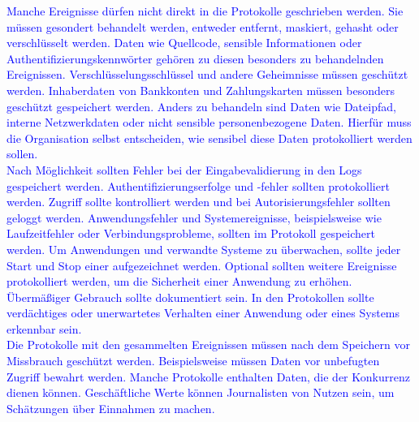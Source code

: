 \textcolor{blue}{
    Manche Ereignisse dürfen nicht direkt in die Protokolle geschrieben werden.
    Sie müssen gesondert behandelt werden, entweder entfernt, maskiert, gehasht oder verschlüsselt werden.
    Daten wie Quellcode, sensible Informationen oder Authentifizierungskennwörter gehören zu diesen besonders zu behandelnden Ereignissen.
    Verschlüsselungsschlüssel und andere Geheimnisse müssen geschützt werden.
    Inhaberdaten von Bankkonten und Zahlungskarten müssen besonders geschützt gespeichert werden.
    Anders zu behandeln sind Daten wie Dateipfad, interne Netzwerkdaten oder nicht sensible personenbezogene Daten.
    Hierfür muss die Organisation selbst entscheiden, wie sensibel diese Daten protokolliert werden sollen.
    \\
    Nach Möglichkeit sollten Fehler bei der Eingabevalidierung in den Logs gespeichert werden.
    Authentifizierungserfolge und -fehler sollten protokolliert werden.
    Zugriff sollte kontrolliert werden und bei Autorisierungsfehler sollten geloggt werden.
    Anwendungsfehler und Systemereignisse, beispielsweise wie Laufzeitfehler oder Verbindungsprobleme, sollten im Protokoll gespeichert werden.
    Um Anwendungen und verwandte Systeme zu überwachen, sollte jeder Start und Stop einer aufgezeichnet werden.
    Optional sollten weitere Ereignisse protokolliert werden, um die Sicherheit einer Anwendung zu erhöhen.
    Übermäßiger Gebrauch sollte dokumentiert sein.
    In den Protokollen sollte verdächtiges oder unerwartetes Verhalten einer Anwendung oder eines Systems erkennbar sein.
    \\
    Die Protokolle mit den gesammelten Ereignissen müssen nach dem Speichern vor Missbrauch geschützt werden.
    Beispielsweise müssen Daten vor unbefugten Zugriff bewahrt werden.
    Manche Protokolle enthalten Daten, die der Konkurrenz dienen können.
    Geschäftliche Werte können Journalisten von Nutzen sein, um Schätzungen über Einnahmen zu machen.
}\autocite{ip-insider, ait, owasp}


